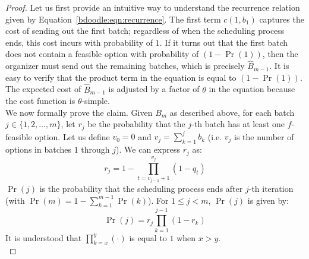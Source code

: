 	\begin{proof}
	Let us first provide an intuitive way to understand the recurrence relation given by Equation~\ref{bdoodle:eqn:recurrence}. The first term $c(1, b_1)$ captures the cost of sending out the first batch; regardless of when the scheduling process ends, this cost incurs with probability of $1$. If it turns out that the first batch does not contain a feasible option with probability of $(1 - \Pr(1))$, then the organizer must send out the remaining batches, which is precisely $\hat{B}_{m-1}$. It is easy to verify that the product term in the equation is equal to $(1 - \Pr(1))$. The expected cost of $\hat{B}_{m-1}$ is adjusted by a factor of $\theta$ in the equation because the cost function is $\theta$-simple. \\

	We now formally prove the claim. Given $B_{m}$ as described above, for each batch $j \in \{1, 2, \dots, m\}$, let $r_j$ be the probability that the $j$-th batch has at least one $f$-feasible option. Let us define $v_0 = 0$ and $v_j = \sum_{k=1}^{j} b_k$ (i.e. $v_j$ is the number of options in batches $1$ through $j$).
	We can express $r_j$ as:
	\begin{equation} \label{bdoodle:eqn:r_j}
	r_j = 1 - \prod_{t=v_{j-1} + 1}^{v_j} (1 - q_t)
	\end{equation}
	$\Pr(j)$ is the probability that the scheduling process ends after $j$-th iteration (with $\Pr(m) = 1 - \sum_{k=1}^{m-1} \Pr(k)$). For $1 \leq j < m$, $\Pr(j)$ is given by:
	\begin{equation} \label{bdoodle:eqn:Pr_j}
	\Pr(j) =  r_j  \prod_{k=1}^{j-1} (1 - r_k)
	\end{equation}
	It is understood that $\prod_{k=x}^{y} (\cdot)$ is equal to $1$ when $x > y$. \\


\end{proof}
